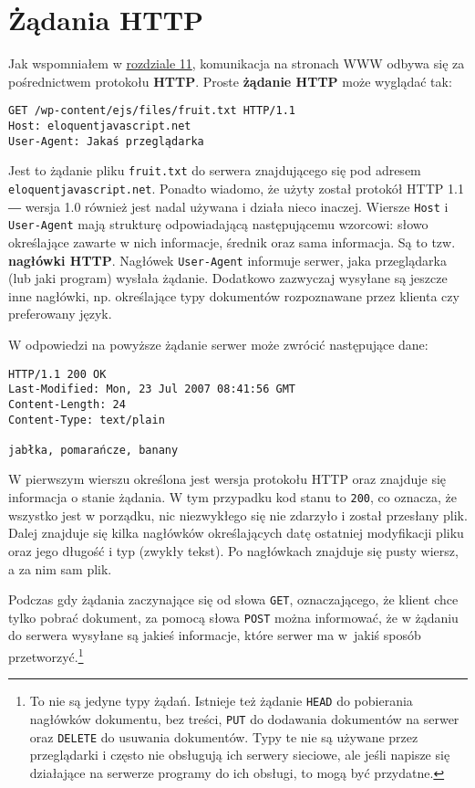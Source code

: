 \chapter{ Żądania HTTP}
\label{chap:14}

Jak wspomniałem w \hyperref[chap:11]{rozdziale 11}, komunikacja na stronach WWW odbywa się za pośrednictwem protokołu \textbf{HTTP}. Proste \textbf{żądanie HTTP} może wyglądać tak:
  
\begin{verbatim} 
GET /wp-content/ejs/files/fruit.txt HTTP/1.1
Host: eloquentjavascript.net
User-Agent: Jakaś przeglądarka
\end{verbatim}
  
Jest to żądanie pliku \texttt{fruit.txt} do serwera znajdującego się pod adresem \texttt{eloquentjavascript.net}. Ponadto wiadomo, że użyty został protokół HTTP 1.1 ― wersja 1.0 również jest nadal używana i działa nieco inaczej. Wiersze \texttt{Host} i \texttt{User-Agent} mają strukturę odpowiadającą następującemu wzorcowi: słowo określające zawarte w nich informacje, średnik oraz sama informacja. Są to tzw. \textbf{nagłówki HTTP}. Nagłówek \texttt{User-Agent} informuje serwer, jaka przeglądarka (lub jaki program) wysłała żądanie. Dodatkowo zazwyczaj wysyłane są jeszcze inne nagłówki, np. określające typy dokumentów rozpoznawane przez klienta czy preferowany język.

  
W odpowiedzi na powyższe żądanie serwer może zwrócić następujące dane:

  
\begin{verbatim} 
HTTP/1.1 200 OK
Last-Modified: Mon, 23 Jul 2007 08:41:56 GMT
Content-Length: 24
Content-Type: text/plain

jabłka, pomarańcze, banany
\end{verbatim}
  
W pierwszym wierszu określona jest wersja protokołu HTTP oraz znajduje się informacja o stanie żądania. W tym przypadku kod stanu to \texttt{200}, co oznacza, że wszystko jest w porządku, nic niezwykłego się nie zdarzyło i został przesłany plik. Dalej znajduje się kilka nagłówków określających datę ostatniej modyfikacji pliku oraz jego długość i typ (zwykły tekst). Po nagłówkach znajduje się pusty wiersz, a za nim sam plik.

  
Podczas gdy żądania zaczynające się od słowa \texttt{GET}, oznaczającego, że klient chce tylko pobrać dokument, za pomocą słowa \texttt{POST} można informować, że w żądaniu do serwera wysyłane są jakieś informacje, które serwer ma w~jakiś sposób przetworzyć.\footnote{To nie są jedyne typy żądań. Istnieje też żądanie \texttt{HEAD} do pobierania nagłówków dokumentu, bez treści, \texttt{PUT} do dodawania dokumentów na serwer oraz \texttt{DELETE} do usuwania dokumentów. Typy te nie są używane przez przeglądarki i często nie obsługują ich serwery sieciowe, ale jeśli napisze się działające na serwerze programy do ich obsługi, to mogą być przydatne.}



